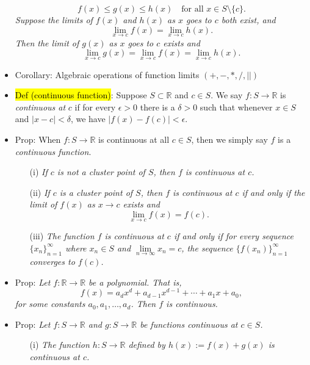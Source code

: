 \documentclass[a4paper,10pt]{article}
\begin{document}
\begin{multicols}{2}
\begin{itemize}
    \[
    f(x) \leq g(x) \leq h(x) \quad \text{for all } x \in S \setminus \{c\}.
    \]
    \textit{Suppose the limits of \( f(x) \) and \( h(x) \) as \( x \) goes to \( c \) both exist, and}
    \[
    \lim_{x \to c} f(x) = \lim_{x \to c} h(x).
    \]
    \textit{Then the limit of \( g(x) \) as \( x \) goes to \( c \) exists and}
    \[
    \lim_{x \to c} g(x) = \lim_{x \to c} f(x) = \lim_{x \to c} h(x).
    \]
    \item Corollary: Algebraic operations of function limits $(+,-,*,/,||)$
    \item \hl{Def (continuous function)}: Suppose \( S \subset \mathbb{R} \) and \( c \in S \). We say \( f: S \to \mathbb{R} \) is \textit{continuous at} \( c \) if for every \( \epsilon > 0 \) there is a \( \delta > 0 \) such that whenever \( x \in S \) and \( |x - c| < \delta \), we have \( |f(x) - f(c)| < \epsilon \). 

    \item Prop: When \( f: S \to \mathbb{R} \) is continuous at all \( c \in S \), then we simply say \( f \) is a \textit{continuous function}.
    \begin{itemize}
        \item[(i)] \textit{If \( c \) is not a cluster point of \( S \), then \( f \) is continuous at \( c \).}
        
        \item[(ii)] \textit{If \( c \) is a cluster point of \( S \), then \( f \) is continuous at \( c \) if and only if the limit of \( f(x) \) as \( x \to c \) exists and}
        \[
        \lim_{x \to c} f(x) = f(c).
        \]
        
        \item[(iii)] \textit{The function \( f \) is continuous at \( c \) if and only if for every sequence \( \{x_n\}_{n=1}^{\infty} \) where \( x_n \in S \) and \( \lim\limits_{n \to \infty} x_n = c \), the sequence \( \{ f(x_n) \}_{n=1}^{\infty} \) converges to \( f(c) \).}
    \end{itemize}
    \item Prop: \textit{Let \( f: \mathbb{R} \to \mathbb{R} \) be a polynomial. That is,}
    \[
    f(x) = a_d x^d + a_{d-1} x^{d-1} + \cdots + a_1 x + a_0,
    \]
    \textit{for some constants \( a_0, a_1, \dots, a_d \). Then \( f \) is continuous.}

    \item Prop: \textit{Let \( f: S \to \mathbb{R} \) and \( g: S \to \mathbb{R} \) be functions continuous at \( c \in S \).}
    \begin{itemize}
        \item[(i)] \textit{The function \( h: S \to \mathbb{R} \) defined by \( h(x) := f(x) + g(x) \) is continuous at \( c \).}
        

\end{itemize}
\end{itemize}
\end{multicols}
\end{document}
